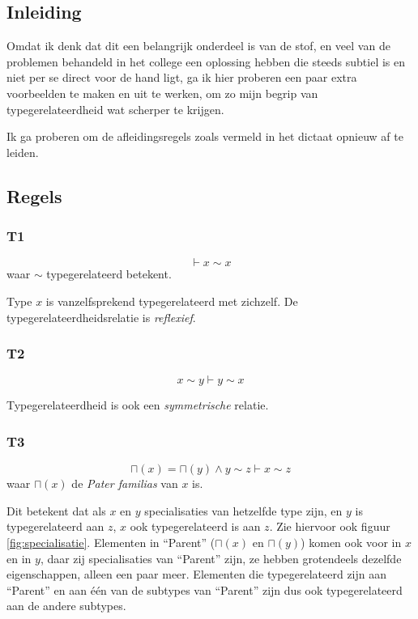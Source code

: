 \documentclass{article}
\begin{document}
\subsection{Inleiding}
Omdat ik denk dat dit een belangrijk onderdeel is van de stof, en veel van de
problemen behandeld in het college een oplossing hebben die steeds subtiel is 
en niet per se direct voor de hand ligt, ga ik hier proberen een paar extra
voorbeelden te maken en uit te werken, om zo mijn begrip van 
typegerelateerdheid wat scherper te krijgen.

Ik ga proberen om de afleidingsregels zoals vermeld in het dictaat 
\cite[p.~41]{dictaat} opnieuw af te leiden.

\subsection{Regels}
\label{sse:regels}
\subsubsection{T1}

\[ 
  \vdash x \sim x
\] waar $\sim$ typegerelateerd betekent.

Type $x$ is vanzelfsprekend typegerelateerd met zichzelf. De typegerelateerdheidsrelatie
is \emph{reflexief}.

\subsubsection{T2}
\[ 
  x \sim y \vdash y \sim x
\]

Typegerelateerdheid is ook een \emph{symmetrische} relatie.

\subsubsection{T3}
\label{s2e:t3}
\[
  \sqcap (x) = \sqcap (y) \wedge y \sim z \vdash x \sim z
\] waar $\sqcap (x)$ de \emph{Pater familias} van $x$ is.

Dit betekent dat als $x$ en $y$ specialisaties van hetzelfde
type zijn, en $y$ is typegerelateerd aan $z$, $x$ ook typegerelateerd is
aan $z$. Zie hiervoor ook figuur \ref{fig:specialisatie}. Elementen in
``Parent'' ($\sqcap(x)$ en $\sqcap(y)$) komen ook voor in $x$ en in $y$, daar
zij specialisaties van ``Parent'' zijn, ze hebben grotendeels dezelfde
eigenschappen, alleen een paar meer. Elementen die typegerelateerd zijn aan
``Parent'' en aan \'e\'en van de subtypes van ``Parent'' zijn dus ook
typegerelateerd aan de andere subtypes.
\end{document}
